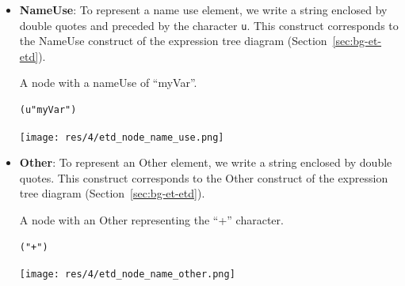 \begin{chapterBody}
\begin{itemize}
\begin{minipage}{.3\linewidth}
A node with a nameDef of ``myVar''.
\end{minipage}
\hspace{.02\linewidth}
\begin{minipage}{.3\linewidth}
\begin{lstlisting}[language=etl]
(d"myVar")
\end{lstlisting} 
\end{minipage}
\hspace{.02\linewidth}
\begin{minipage}{.3\linewidth}
\texttt{[image: res/4/etd\_node\_name\_def.png]}
\end{minipage}

    \item \textbf{NameUse}: To represent a name use element, we write a string
enclosed by double quotes and preceded by the character \texttt{u}.
This construct corresponds to the NameUse construct of the expression tree
diagram (Section~\ref{sec:bg-et-etd}).

\begin{minipage}{.3\linewidth}
A node with a nameUse of ``myVar''.
\end{minipage}
\hspace{.02\linewidth}
\begin{minipage}{.3\linewidth}
\begin{lstlisting}[language=etl]
(u"myVar")
\end{lstlisting} 
\end{minipage}
\hspace{.02\linewidth}
\begin{minipage}{.3\linewidth}
\texttt{[image: res/4/etd\_node\_name\_use.png]}
\end{minipage}

    \item \textbf{Other}: To represent an Other element, we write a string
enclosed by double quotes. This construct corresponds to the Other construct of 
the expression tree diagram (Section~\ref{sec:bg-et-etd}). 

\begin{minipage}{.3\linewidth}
A node with an Other representing the ``+'' character.
\end{minipage}
\hspace{.02\linewidth}
\begin{minipage}{.3\linewidth}
\begin{lstlisting}[language=etl]
("+")
\end{lstlisting} 
\end{minipage}
\hspace{.02\linewidth}
\begin{minipage}{.3\linewidth}
\texttt{[image: res/4/etd\_node\_name\_other.png]}
\end{minipage}


\end{itemize}
\end{chapterBody}
